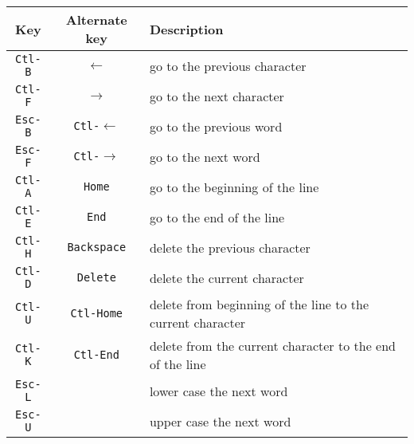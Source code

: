\begin{tabular}{|c|c|l|}
\hline

Key & Alternate key & Description \\

\hline\hline

\texttt{Ctl-B} & \texttt{$\leftarrow$} & go to the previous character \\

\hline

\texttt{Ctl-F} & \texttt{$\rightarrow$} & go to the next character \\

\hline

\texttt{Esc-B} & \texttt{Ctl-$\leftarrow$} & go to the previous word \\

\hline

\texttt{Esc-F} & \texttt{Ctl-$\rightarrow$} & go to the next word \\

\hline

\texttt{Ctl-A} & \texttt{Home} & go to the beginning of the line \\

\hline

\texttt{Ctl-E} & \texttt{End} & go to the end of the line \\

\hline

\texttt{Ctl-H} & \texttt{Backspace} & delete the previous character \\

\hline

\texttt{Ctl-D} & \texttt{Delete} & delete the current character \\

\hline

\texttt{Ctl-U} & \texttt{Ctl-Home} & delete from beginning of the line to the current character  \\

\hline

\texttt{Ctl-K} & \texttt{Ctl-End} & delete from the current character to the end of the line \\

\hline

\texttt{Esc-L} & & lower case the next word \\

\hline

\texttt{Esc-U} & & upper case the next word \\


\end{tabular}
